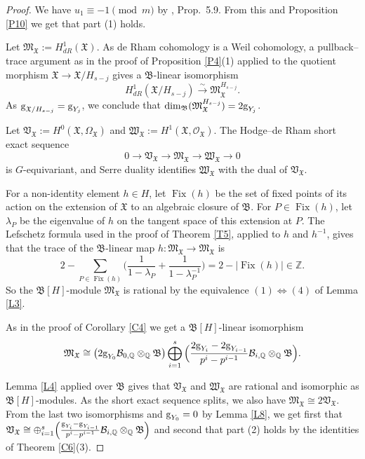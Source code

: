 \documentclass[11pt]{amsart}
\begin{document}
\begin{proof}%
We have $u_1\equiv-1\pmod m$ by \cite{O1}, Prop.\ 5.9. From this and Proposition \ref{P10} we get that part (1) holds. 

Let $\mathfrak M_{\mathfrak X}:=H^1_{dR}(\mathfrak X)$. As de Rham cohomology is a Weil cohomology, a pullback--trace argument as in the proof of Proposition \ref{P4}(1) applied to
the quotient morphism $\mathfrak X\rightarrow \mathfrak X/H_{s-j}$ gives a $\mathfrak B$-linear isomorphism
\[
H^1_{dR}(\mathfrak X/H_{s-j})
\xrightarrow{\ \sim\ }
\mathfrak M_{\mathfrak X}^{H_{s-j}}.
\]
As $\textup{g}_{\mathfrak X/H_{s-j}}=\textup{g}_{Y_j}$, we conclude that $\dim_{\mathfrak B}(\mathfrak M_{\mathfrak X}^{H_{s-j}})=2\textup{g}_{Y_j}$. 

Let $\mathfrak V_{\mathfrak X}:=
H^0(\mathfrak X,\Omega_{\mathfrak X})$ and
$\mathfrak W_{\mathfrak X}:=
H^1(\mathfrak X,\mathcal O_{\mathfrak X})$. The Hodge--de Rham
short exact sequence
\[
0\longrightarrow\mathfrak V_{\mathfrak X}\longrightarrow
\mathfrak M_{\mathfrak X}\longrightarrow\mathfrak W_{\mathfrak X}
\longrightarrow0
\]
is $G$-equivariant, and Serre duality identifies $\mathfrak W_{\mathfrak X}$ with the dual of $\mathfrak V_{\mathfrak X}$.

For a non-identity element $h\in H$, let
$\operatorname{Fix}(h)$ be the set of fixed points of its action on the extension of $\mathfrak X$ to an algebraic closure of $\mathfrak B$. For $P\in\operatorname{Fix}(h)$, let $\lambda_P$
be the eigenvalue of $h$ on the tangent space of this extension at $P$. The Lefschetz formula
used in the proof of Theorem \ref{T5}, applied to $h$ and $h^{-1}$, gives that the trace of the $\mathfrak B$-linear map $h:\mathfrak M_{\mathfrak X}\rightarrow \mathfrak M_{\mathfrak X}$ is
$$2-\sum_{P\in\operatorname{Fix}(h)}
\Big(\frac{1}{1-\lambda_P}+\frac{1}{1-\lambda_P^{-1}}\Big)=2-|\operatorname{Fix}(h)|\in\mathbb Z.$$
So the $\mathfrak B[H]$-module $\mathfrak M_{\mathfrak X}$ is rational by the equivalence $(1)\Leftrightarrow (4)$ of Lemma \ref{L3}. 

As in the proof of Corollary \ref{C4} we get a $\mathfrak B[H]$-linear isomorphism
$$\mathfrak M_{\mathfrak X}\cong \bigl(2\textup{g}_{Y_0}\mathcal B_{0,\mathbb Q}\otimes_{\mathbb Q}\mathfrak B\bigr)\bigoplus_{i=1}^s \Big(\frac{2\textup{g}_{Y_i}-2\textup{g}_{Y_{i-1}}}{p^i-p^{i-1}}\mathcal B_{i,\mathbb Q}\otimes_{\mathbb Q}\mathfrak B\Big).$$ 

Lemma \ref{L4} applied over $\mathfrak B$ gives that $\mathfrak V_{\mathfrak X}$
and $\mathfrak W_{\mathfrak X}$ are rational and isomorphic as $\mathfrak B[H]$-modules.
As the short exact sequence splits, we also have
$\mathfrak M_{\mathfrak X}\cong 2\mathfrak V_{\mathfrak X}$. From the last two isomorphisms and $\textup{g}_{Y_0}=0$ by Lemma \ref{L8}, we get first that $\mathfrak V_{\mathfrak X}\cong\oplus_{i=1}^s \Big(\frac{\textup{g}_{Y_i}-\textup{g}_{Y_{i-1}}}{p^i-p^{i-1}}\mathcal B_{i,\mathbb Q}\otimes_{\mathbb Q}\mathfrak B\Big)$ and second that part (2) holds by the identities of Theorem \ref{C6}(3).\end{proof}
\end{document}
